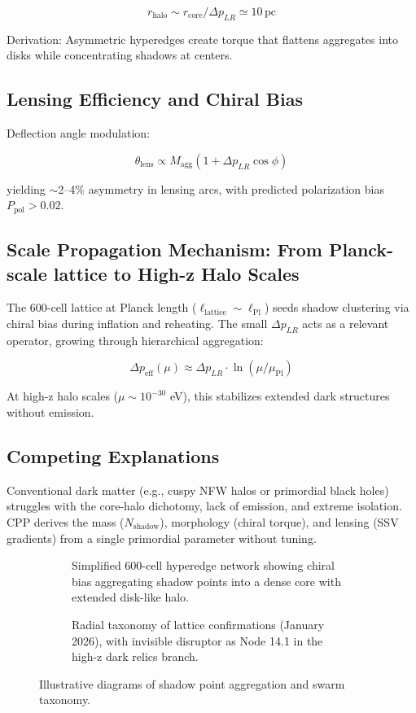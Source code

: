 \documentclass[11pt]{article}
\begin{document}
\[
r_{\text{halo}} \sim r_{\text{core}} / \Delta p_{LR} \simeq 10 \, \text{pc}
\]

Derivation: Asymmetric hyperedges create torque that flattens aggregates into disks while concentrating shadows at centers.

\subsection{Lensing Efficiency and Chiral Bias}
Deflection angle modulation:

\[
\theta_{\text{lens}} \propto M_{\text{agg}} (1 + \Delta p_{LR} \cos\phi)
\]

yielding $\sim$2--4\% asymmetry in lensing arcs, with predicted polarization bias $P_{\text{pol}} > 0.02$.

\subsection{Scale Propagation Mechanism: From Planck-scale lattice to High-z Halo Scales}
The 600-cell lattice at Planck length ($\ell_{\text{lattice}} \sim \ell_{\text{Pl}}$) seeds shadow clustering via chiral bias during inflation and reheating. The small $\Delta p_{LR}$ acts as a relevant operator, growing through hierarchical aggregation:

\[
\Delta p_{\text{eff}}(\mu) \approx \Delta p_{LR} \cdot \ln(\mu / \mu_{\text{Pl}})
\]

At high-z halo scales ($\mu \sim 10^{-30}$ eV), this stabilizes extended dark structures without emission.

\subsection{Competing Explanations}
Conventional dark matter (e.g., cuspy NFW halos or primordial black holes) struggles with the core-halo dichotomy, lack of emission, and extreme isolation. CPP derives the mass ($N_{\text{shadow}}$), morphology (chiral torque), and lensing (SSV gradients) from a single primordial parameter without tuning.

\begin{figure}[htbp]
\centering
\begin{subfigure}{0.45\textwidth}
\centering
\caption{Simplified 600-cell hyperedge network showing chiral bias aggregating shadow points into a dense core with extended disk-like halo.}
\label{fig:shadow-agg}
\end{subfigure}
\hfill
\begin{subfigure}{0.45\textwidth}
\centering
\caption{Radial taxonomy of lattice confirmations (January 2026), with invisible disruptor as Node 14.1 in the high-z dark relics branch.}
\label{fig:taxonomy}
\end{subfigure}
\caption{Illustrative diagrams of shadow point aggregation and swarm taxonomy.}
\end{figure}
\end{document}
